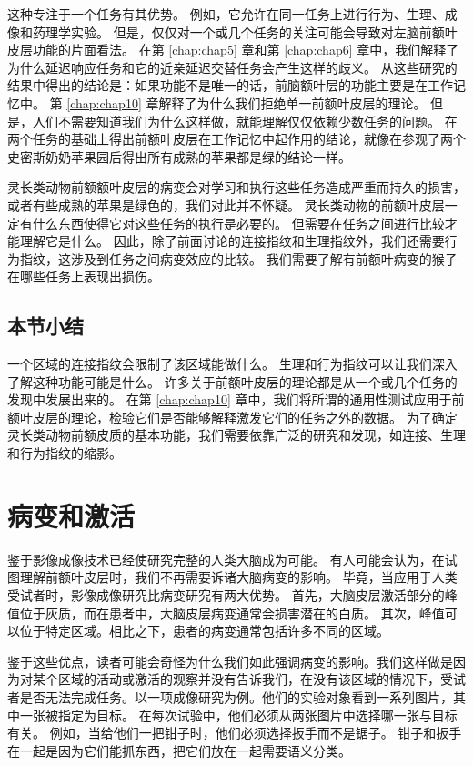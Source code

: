 \par
这种专注于一个任务有其优势。
例如，它允许在同一任务上进行行为、生理、成像和药理学实验。
但是，仅仅对一个或几个任务的关注可能会导致对左脑前额叶皮层功能的片面看法。
在第 \ref{chap:chap5} 章和第 \ref{chap:chap6} 章中，我们解释了为什么延迟响应任务和它的近亲延迟交替任务会产生这样的歧义。
从这些研究的结果中得出的结论是：如果功能不是唯一的话，前脑额叶层的功能主要是在工作记忆中。
第 \ref{chap:chap10} 章解释了为什么我们拒绝单一前额叶皮层的理论。
但是，人们不需要知道我们为什么这样做，就能理解仅仅依赖少数任务的问题。
在两个任务的基础上得出前额叶皮层在工作记忆中起作用的结论，就像在参观了两个史密斯奶奶苹果园后得出所有成熟的苹果都是绿的结论一样。
\par
灵长类动物前额额叶皮层的病变会对学习和执行这些任务造成严重而持久的损害，或者有些成熟的苹果是绿色的，我们对此并不怀疑。
灵长类动物的前额叶皮层一定有什么东西使得它对这些任务的执行是必要的。
但需要在任务之间进行比较才能理解它是什么。
因此，除了前面讨论的连接指纹和生理指纹外，我们还需要行为指纹，这涉及到任务之间病变效应的比较。
我们需要了解有前额叶病变的猴子在哪些任务上表现出损伤。

\subsection{本节小结}
一个区域的连接指纹会限制了该区域能做什么。
生理和行为指纹可以让我们深入了解这种功能可能是什么。
许多关于前额叶皮层的理论都是从一个或几个任务的发现中发展出来的。
在第 \ref{chap:chap10} 章中，我们将所谓的通用性测试应用于前额叶皮层的理论，检验它们是否能够解释激发它们的任务之外的数据。
为了确定灵长类动物前额皮质的基本功能，我们需要依靠广泛的研究和发现，如连接、生理和行为指纹的缩影。

\section{病变和激活}
鉴于影像成像技术已经使研究完整的人类大脑成为可能。
有人可能会认为，在试图理解前额叶皮层时，我们不再需要诉诸大脑病变的影响。
毕竟，当应用于人类受试者时，影像成像研究比病变研究有两大优势。
首先，大脑皮层激活部分的峰值位于灰质，而在患者中，大脑皮层病变通常会损害潜在的白质。
其次，峰值可以位于特定区域。相比之下，患者的病变通常包括许多不同的区域。


\par
鉴于这些优点，读者可能会奇怪为什么我们如此强调病变的影响。我们这样做是因为对某个区域的活动或激活的观察并没有告诉我们，在没有该区域的情况下，受试者是否无法完成任务。以一项成像研究为例\cite{price1999delineating}。他们的实验对象看到一系列图片，其中一张被指定为目标。
在每次试验中，他们必须从两张图片中选择哪一张与目标有关。
例如，当给他们一把钳子时，他们必须选择扳手而不是锯子。
钳子和扳手在一起是因为它们能抓东西，把它们放在一起需要语义分类。


